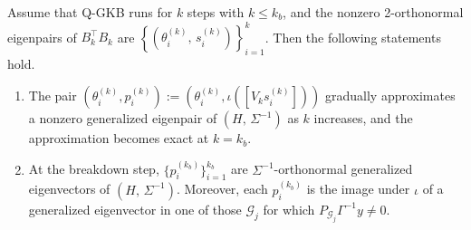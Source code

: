 \documentclass[]{myarticle}
\begin{document}
\begin{theorem}\label{thm:qgkb-lanczos}
  Assume that Q-GKB runs for $k$ steps with $k\leq k_b$, and the nonzero 2-orthonormal eigenpairs of $B_{k}^{\top}B_{k}$ are $\left\{(\theta_{i}^{(k)},\,s_{i}^{(k)})\right\}_{i=1}^{k}$. Then the following statements hold.
\begin{enumerate}
  \item[(a)] The pair $\left(\theta_{i}^{(k)}, p_{i}^{(k)}\right):=\left(\theta_{i}^{(k)},\iota\left([V_{k}s_{i}^{(k)}]\right)\right)$ gradually approximates a nonzero generalized eigenpair of $(H,\,\Sigma^{-1})$ as $k$ increases, and the approximation becomes exact at $k=k_b$.
  \item[(b)] At the breakdown step, $\{p_{i}^{(k_b)}\}_{i=1}^{k_b}$ are $\Sigma^{-1}$-orthonormal generalized eigenvectors of $(H,\,\Sigma^{-1})$. Moreover, each $p_i^{(k_b)}$ is the image under $\iota$ of a generalized eigenvector in one of those $\mathcal G_j$ for which $P_{\mathcal G_j}\Gamma^{-1}y\neq 0$. 
\end{enumerate}
\end{theorem}
\end{document}

